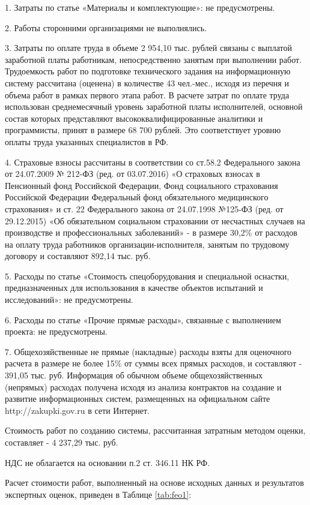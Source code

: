 1.	Затраты по статье «Материалы и комплектующие»:	не предусмотрены.

2. Работы сторонними организациями не выполнялись.

3. Затраты по оплате труда в объеме 2 954,10 тыс. рублей связаны с выплатой заработной платы работникам, непосредственно занятым при выполнении работ. Трудоемкость работ по подготовке технического задания на информационную систему рассчитана (оценена) в количестве 43 чел.-мес., исходя из перечня и объема работ в рамках первого этапа работ. В расчете затрат по оплате труда использован среднемесячный уровень заработной платы исполнителей, основной состав которых представляют высококвалифицированные аналитики и программисты, принят в размере 68 700 рублей. Это соответствует уровню оплаты труда указанных специалистов в РФ.

4. Страховые взносы рассчитаны в соответствии со ст.58.2 Федерального закона от 24.07.2009 № 212-ФЗ (ред. от 03.07.2016) «О страховых взносах в Пенсионный фонд Российской Федерации, Фонд социального страхования Российской Федерации Федеральный фонд обязательного медицинского страхования» и ст. 22 Федерального закона от 24.07.1998 №125-ФЗ (ред. от 29.12.2015) «Об обязательном социальном страховании от несчастных случаев на производстве и профессиональных заболеваний» - в размере 30,2\% от расходов на оплату труда работников организации-исполнителя, занятым по трудовому договору и составляют 892,14 тыс. руб.

5.	Расходы по статье «Стоимость спецоборудования и специальной оснастки, предназначенных для использования в качестве объектов испытаний и исследований»: не предусмотрены.

6.	Расходы по статье «Прочие прямые расходы», связанные с выполнением проекта: не предусмотрены.

7.	Общехозяйственные не прямые (накладные) расходы взяты для оценочного расчета в размере не более 15\% от суммы всех прямых расходов, и составляют - 391,05 тыс. руб. Информация об обычном объеме общехозяйственных (непрямых) расходах получена исходя из анализа контрактов на создание и развитие информационных систем, размещенных на официальном сайте http://zakupki.gov.ru в сети Интернет.

Стоимость работ по созданию системы, рассчитанная затратным методом оценки, составляет - 4 237,29 тыс. руб.

НДС не облагается на основании п.2 ст. 346.11 НК РФ. 

Расчет стоимости работ, выполненный на основе исходных данных и результатов экспертных оценок, приведен в Таблице \ref{tab:feo1}:


